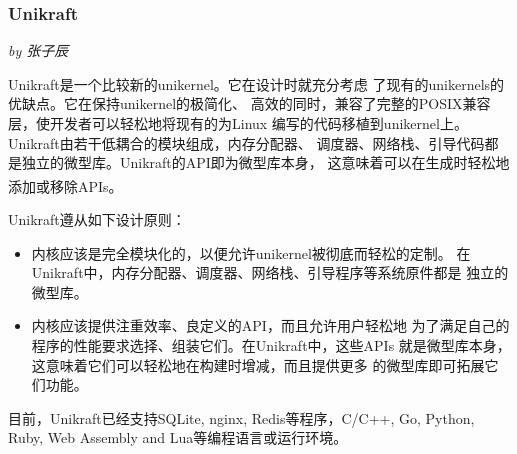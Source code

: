 \documentclass[UTF8,fontset=none,linespread=1.15]{ctexart}
\let\nosupcite\cite
\renewcommand*{\cite}[1]{\textsuperscript{\nosupcite{#1}}}
\newcommand{\sectionauthor}[1]{%
\vspace*{-5ex}
\noindent\textrm{\hfill\textit{by #1}}
\vspace*{2ex}\par}
\begin{document}

\subsubsection{Unikraft}\sectionauthor{张子辰}
Unikraft是一个比较新的unikernel。它在设计时就充分考虑
了现有的unikernels的优缺点。它在保持unikernel的极简化、
高效的同时，兼容了完整的POSIX兼容层，使开发者可以轻松地将现有的为Linux
编写的代码移植到unikernel上。Unikraft由若干低耦合的模块组成，内存分配器、
调度器、网络栈、引导代码都是独立的微型库。Unikraft的API即为微型库本身，
这意味着可以在生成时轻松地添加或移除APIs。\cite{bib:unikraft}

Unikraft遵从如下设计原则：
\begin{itemize}
\item 内核应该是完全模块化的，以便允许unikernel被彻底而轻松的定制。
在Unikraft中，内存分配器、调度器、网络栈、引导程序等系统原件都是
独立的微型库。
\item 内核应该提供注重效率、良定义的API，而且允许用户轻松地
为了满足自己的程序的性能要求选择、组装它们。在Unikraft中，这些APIs
就是微型库本身，这意味着它们可以轻松地在构建时增减，而且提供更多
的微型库即可拓展它们功能。
\end{itemize}

目前，Unikraft已经支持SQLite, nginx, Redis等程序，C/C++, Go, Python, Ruby,
Web Assembly and Lua等编程语言或运行环境。
\end{document}
